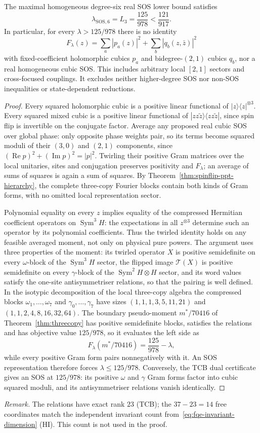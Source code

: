 \begin{theorem}
\label{thm:sextic-sos-obstruction}
The maximal homogeneous degree-six real SOS lower bound satisfies
\[
 \boxed{\quad
 \lambda_{\mathrm{SOS},6}=L_3=\frac{125}{978}<\frac{121}{917}.\quad}
\]
In particular, for every $\lambda>125/978$ there
is no identity
\[
 F_\lambda(z)=\sum_a|p_a(z)|^2+\sum_b|q_b(z,\bar z)|^2
\]
with fixed-coefficient holomorphic cubics $p_a$ and bidegree-$(2,1)$
cubics $q_b$, nor a real homogeneous cubic SOS.
This includes arbitrary local $[2,1]$ sectors and cross-focused
couplings. It excludes neither higher-degree SOS nor non-SOS
inequalities or state-dependent reductions.
\end{theorem}
\begin{proof}
Every squared holomorphic cubic is a positive linear functional of
$|z\rangle\langle z|^{\otimes3}$. Every squared mixed cubic is a
positive linear functional of
$|zz\widetilde z\rangle\langle zz\widetilde z|$, since spin flip
is invertible on the conjugate factor. Average any proposed real
cubic SOS over global phase: only opposite phase weights pair, so
its terms become squared moduli of their $(3,0)$ and $(2,1)$
components, since $(\operatorname{Re}p)^2+(\operatorname{Im}p)^2=|p|^2$. Twirling their positive Gram matrices over the local
unitaries, sites and conjugation preserves positivity and $F_\lambda$; an average of sums of squares is
again a sum of squares.
By Theorem~\ref{thm:spinflip-ppt-hierarchy}, the complete three-copy
Fourier blocks contain both kinds of Gram forms, with no omitted
local representation sector.

Polynomial equality on every $z$ implies equality of the compressed
Hermitian coefficient operators on $\operatorname{Sym}^3H$: the
expectations in all $z^{\otimes3}$ determine such an operator by
its polynomial coefficients. Thus the twirled identity holds on
any feasible averaged moment, not only on physical pure powers.
The argument uses three properties of the moment: its twirled operator $X$ is positive semidefinite on every
$\omega$-block of the $\operatorname{Sym}^3H$ sector, the flipped image $\mathcal T(X)$ is positive semidefinite on
every $\gamma$-block of the $\operatorname{Sym}^2H\otimes H$ sector, and its word values satisfy the one-site
antisymmetriser relations, so that the pairing is well defined. In the isotypic decomposition of the local
three-copy algebra the compressed blocks $\omega_1,\dots,\omega_7$ and $\gamma_0,\dots,\gamma_7$ have sizes $(1,1,1,3,5,11,21)$ and
$(1,1,2,4,8,16,32,64)$.
The boundary pseudo-moment $m^*/70416$ of Theorem~\ref{thm:threecopy} has positive semidefinite blocks,
satisfies the relations and has objective value $125/978$, so it evaluates the left side as
\[
 F_\lambda(m^*/70416)=\frac{125}{978}-\lambda,
\]
while every positive Gram form pairs nonnegatively with it. An SOS representation therefore forces
$\lambda\le125/978$.
Conversely, the TCB dual certificate gives an SOS at $125/978$: its positive
$\omega$ and $\gamma$ Gram forms factor into cubic squared moduli,
and its antisymmetriser relations vanish identically.
\end{proof}

\noindent\emph{Remark.} The relations have exact rank $23$ (TCB); the $37-23=14$ free coordinates match
the independent invariant count from~\eqref{eq:fqe-invariant-dimension} (HI). This count is not
used in the proof.
